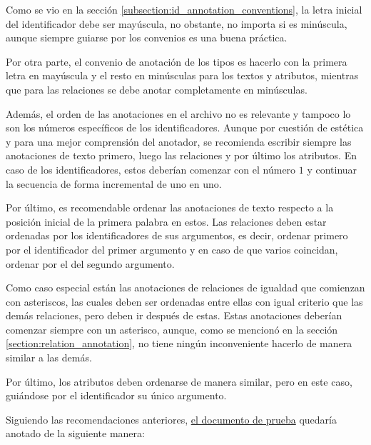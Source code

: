 Como se vio en la sección \ref{subsection:id_annotation_conventions}, la letra inicial del identificador debe ser mayúscula, no obstante, no importa si es minúscula, aunque siempre guiarse por los convenios es una buena práctica.

Por otra parte, el convenio de anotación de los tipos es hacerlo con la primera letra en mayúscula y el resto en minúsculas para los textos y atributos, mientras que para las relaciones se debe anotar completamente en minúsculas.

Además, el orden de las anotaciones en el archivo no es relevante y tampoco lo son los números específicos de los identificadores. Aunque por cuestión de estética y para una mejor comprensión del anotador, se recomienda escribir siempre las anotaciones de texto primero, luego las relaciones y por último los atributos. En caso de los identificadores, estos deberían comenzar con el número $1$ y continuar la secuencia de forma incremental de uno en uno.

Por último, es recomendable ordenar las anotaciones de texto respecto a la posición inicial de la primera palabra en estos. Las relaciones deben estar ordenadas por los identificadores de sus argumentos, es decir, ordenar primero por el identificador del primer argumento y en caso de que varios coincidan, ordenar por el del segundo argumento.

Como caso especial están las anotaciones de relaciones de igualdad que comienzan con asteriscos, las cuales deben ser ordenadas entre ellas con igual criterio que las demás relaciones, pero deben ir después de estas. Estas anotaciones deberían comenzar siempre con un asterisco, aunque, como se mencionó en la sección \ref{section:relation_annotation}, no tiene ningún inconveniente hacerlo de manera similar a las demás.

Por último, los atributos deben ordenarse de manera similar, pero en este caso, guiándose por el identificador su único argumento.

Siguiendo las recomendaciones anteriores, \hyperref[sentence:annotation_example]{el documento de prueba} quedaría anotado de la siguiente manera:


